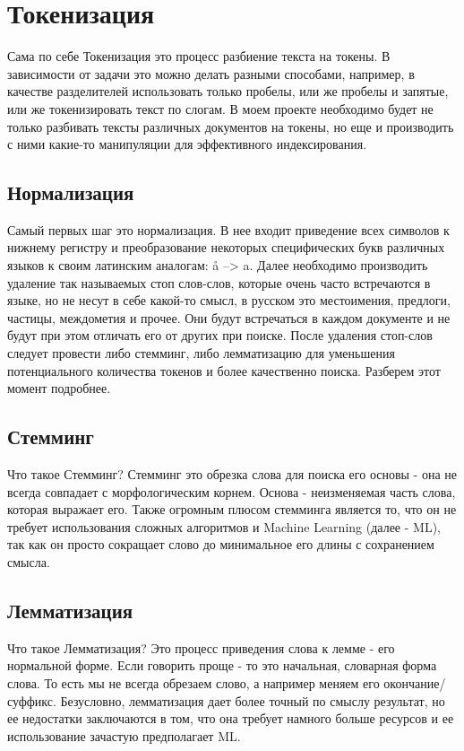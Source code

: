 \section{Токенизация}
Сама по себе Токенизация это процесс разбиение текста на токены. В зависимости от задачи это можно делать разными 
способами, например, в качестве разделителей использовать только пробелы, или же пробелы и запятые, или же 
токенизировать текст по слогам. В моем проекте необходимо будет не только разбивать тексты различных документов на 
токены, но еще и производить с ними какие-то манипуляции для эффективного индексирования. 

\subsection{Нормализация}
Самый первых шаг это нормализация. В нее входит приведение всех символов к нижнему регистру и преобразование некоторых 
специфических букв различных языков к своим латинским аналогам: å --> a. Далее необходимо производить удаление так 
называемых стоп слов-слов, которые очень часто встречаются в языке, но не несут в себе какой-то смысл, в русском это 
местоимения, предлоги, частицы, междометия и прочее. Они будут встречаться в каждом документе и не будут при этом 
отличать его от других при поиске. После удаления стоп-слов следует провести либо стемминг, либо лемматизацию для 
уменьшения потенциального количества токенов и более качественно поиска. Разберем этот момент подробнее. 

\subsection{Стемминг}
Что такое Стемминг? Стемминг это обрезка слова для поиска его основы - она не всегда совпадает с 
морфологическим корнем. Основа - неизменяемая часть слова, которая выражает его. Также огромным плюсом 
стемминга является то, что он не требует использования сложных алгоритмов и Machine Learning (далее - ML), 
так как он просто сокращает слово до минимальное его длины с сохранением смысла. 

\subsection{Лемматизация}
Что такое Лемматизация? Это процесс приведения слова к лемме - его нормальной форме. Если говорить проще - то 
это начальная, словарная форма слова. То есть мы не всегда обрезаем слово, а например меняем его окончание/суффикс. 
Безусловно, лемматизация дает более точный по смыслу результат, но ее недостатки заключаются в том, что она требует 
намного больше ресурсов и ее использование зачастую предполагает ML. 


